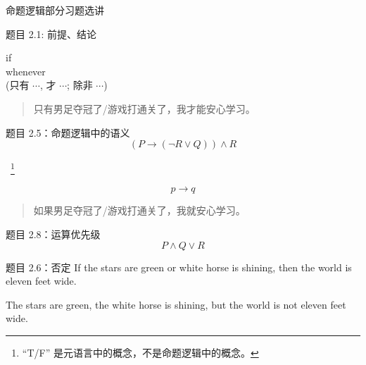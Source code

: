 \begin{frame}{}
  \centerline{\LARGE 命题逻辑部分习题选讲}
\end{frame}

\begin{frame}{}
  \begin{exampleblock}{题目 2.1: 前提、结论}
    \begin{center}
      if \\[8pt]
      whenever \\[12pt]
       (只有 $\cdots$, 才 $\cdots$; 除非 $\cdots$)
    \end{center}
  \end{exampleblock}

  \pause
  \vspace{0.80cm}
  \begin{quote}
    \centerline{只有男足夺冠了/游戏打通关了，我才能安心学习。}
  \end{quote}

\end{frame}

\begin{frame}{}
  \begin{exampleblock}{题目 2.5：命题逻辑中的语义}
    \[
      (P \to (\lnot R \lor Q)) \land R
    \]

    \vspace{0.40cm}
    \centerline{~\footnote{``T/F'' 是元语言中的概念，不是命题逻辑中的概念。}}
  \end{exampleblock}

  \pause

  \[
    p \to q
  \]

  \begin{quote}
    \centerline{如果男足夺冠了/游戏打通关了，我就安心学习。}
  \end{quote}

  \pause
  \begin{exampleblock}{题目 2.8：运算优先级}
    \[
      P \land Q \lor R
    \]
  \end{exampleblock}
\end{frame}

\begin{frame}{}
  \begin{exampleblock}{题目 2.6：否定}
    If the stars are green or white horse is shining,
    then the world is eleven feet wide.
  \end{exampleblock}

  \vspace{0.50cm}

  \centerline{}
  The stars are green, the white horse is shining, but the world is not eleven feet wide.
\end{frame}

